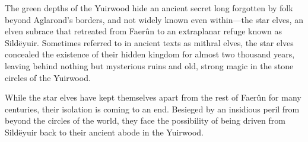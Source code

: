 
The green depths of the Yuirwood hide an ancient secret long forgotten by folk beyond Aglarond’s borders, and not widely known even within—the star elves, an elven subrace that retreated from Faerûn to an extraplanar refuge known as Sildëyuir. Sometimes referred to in ancient texts as mithral elves, the star elves concealed the existence of their hidden kingdom for almost two thousand years, leaving behind nothing but mysterious ruins and old, strong magic in the stone circles of the Yuirwood.

While the star elves have kept themselves apart from the rest of Faerûn for many centuries, their isolation is coming to an end. Besieged by an insidious peril from beyond the circles of the world, they face the possibility of being driven from Sildëyuir back to their ancient abode in the Yuirwood.

